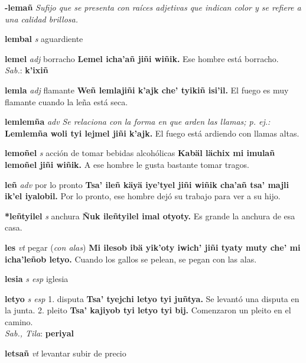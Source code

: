 \documentclass[10pt]{scrbook}
\newcommand{\entry}[1]{\textbf{#1}}
\newcommand{\onedefinition}[1]{#1.}
\newcommand{\nontranslationdef}[1]{\textit{#1}}
\newcommand{\partofspeech}[1]{\textit{#1}}
\newcommand{\spanishtranslation}[1]{#1}
\newcommand{\clarification}[1]{(\textit{#1})}
\newcommand{\cholexample}[1]{\textbf{#1}}
\newcommand{\exampletranslation}[1]{#1}
\newcommand{\dialectvariant}[1]{\\\textit{#1}:}
\newcommand{\dialectword}[1]{\textbf{#1}}
\begin{document}
\begin{multicols}{2}
\entry{-lemañ}
\nontranslationdef{Sufijo que se presenta con raíces adjetivas que indican color y se refiere a una calidad brillosa.}

\entry{lembal}
\partofspeech{s}
\spanishtranslation{aguardiente}

\entry{lemel}
\partofspeech{adj}
\spanishtranslation{borracho}
\cholexample{Lemel icha'añ jiñi wiñik.}
\exampletranslation{Ese hombre está borracho.}
\dialectvariant{Sab.}
\dialectword{k'ixiñ}

\entry{lemla}
\partofspeech{adj}
\spanishtranslation{flamante}
\cholexample{Weñ lemlajiñi k'ajk che' tyikiñ isi'il.}
\exampletranslation{El fuego es muy flamante cuando la leña está seca.}

\entry{lemlemña}
\partofspeech{adv}
\nontranslationdef{Se relaciona con la forma en que arden las llamas; p. ej.:}
\cholexample{Lemlemña woli tyi lejmel jiñi k'ajk.}
\exampletranslation{El fuego está ardiendo con llamas altas.}

\entry{lemoñel}
\partofspeech{s}
\spanishtranslation{acción de tomar bebidas alcohólicas}
\cholexample{Kabäl lächix mi imulañ lemoñel jiñi wiñik.}
\exampletranslation{A ese hombre le gusta bastante tomar tragos.}

\entry{leñ}
\partofspeech{adv}
\spanishtranslation{por lo pronto}
\cholexample{Tsa' ileñ käyä iye'tyel jiñi wiñik cha'añ tsa' majli ik'el iyalobil.}
\exampletranslation{Por lo pronto, ese hombre dejó su trabajo para ver a su hijo.}

\entry{*leñtyilel}
\partofspeech{s}
\spanishtranslation{anchura}
\cholexample{Ñuk ileñtyilel imal otyoty.}
\exampletranslation{Es grande la anchura de esa casa.}

\entry{les}
\partofspeech{vt}
\spanishtranslation{pegar}
\clarification{con alas}
\cholexample{Mi ilesob ibä yik'oty iwich' jiñi tyaty muty che' mi icha'leñob letyo.}
\exampletranslation{Cuando los gallos se pelean, se pegan con las alas.}

\entry{lesia}
\partofspeech{s esp}
\spanishtranslation{iglesia}

\entry{letyo}
\partofspeech{s esp}
\onedefinition{1}
\spanishtranslation{disputa}
\cholexample{Tsa' tyejchi letyo tyi juñtya.}
\exampletranslation{Se levantó una disputa en la junta.}
\onedefinition{2}
\spanishtranslation{pleito}
\cholexample{Tsa' kajiyob tyi letyo tyi bij.}
\exampletranslation{Comenzaron un pleito en el camino.}
\dialectvariant{Sab., Tila}
\dialectword{periyal}

\entry{letsañ}
\partofspeech{vt}
\spanishtranslation{levantar}
\spanishtranslation{subir de precio}


\end{multicols}
\end{document}
